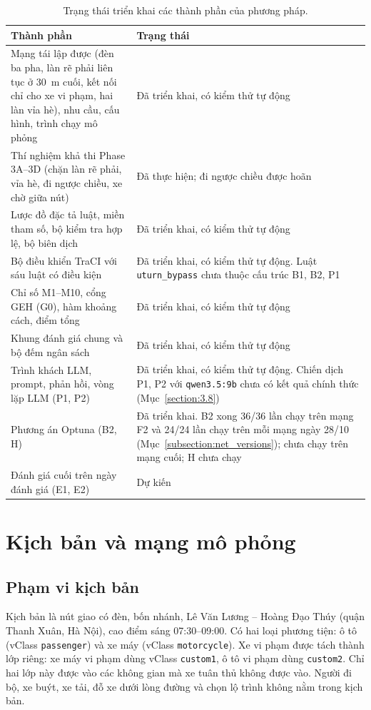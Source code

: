 \documentclass[../DoAn.tex]{subfiles}
\begin{document}
\begin{table}[ht]
\centering
\caption{Trạng thái triển khai các thành phần của phương pháp.}
\label{table:3.1}
\begin{tabular}{|p{6.5cm}|p{7.5cm}|}
\hline
\textbf{Thành phần} & \textbf{Trạng thái} \\ \hline
Mạng tái lập được (đèn ba pha, làn rẽ phải liên tục ở 30~m cuối, kết nối chỉ cho xe vi phạm, hai làn vỉa hè), nhu cầu, cấu hình, trình chạy mô phỏng & Đã triển khai, có kiểm thử tự động \\ \hline
Thí nghiệm khả thi Phase 3A--3D (chặn làn rẽ phải, vỉa hè, đi ngược chiều, xe chờ giữa nút) & Đã thực hiện; đi ngược chiều được hoãn \\ \hline
Lược đồ đặc tả luật, miền tham số, bộ kiểm tra hợp lệ, bộ biên dịch & Đã triển khai, có kiểm thử tự động \\ \hline
Bộ điều khiển TraCI với sáu luật có điều kiện & Đã triển khai, có kiểm thử tự động. Luật \texttt{uturn\_bypass} chưa thuộc cấu trúc B1, B2, P1 \\ \hline
Chỉ số M1--M10, cổng GEH (G0), hàm khoảng cách, điểm tổng & Đã triển khai, có kiểm thử tự động \\ \hline
Khung đánh giá chung và bộ đếm ngân sách & Đã triển khai, có kiểm thử tự động \\ \hline
Trình khách LLM, prompt, phản hồi, vòng lặp LLM (P1, P2) & Đã triển khai, có kiểm thử tự động. Chiến dịch P1, P2 với \texttt{qwen3.5:9b} chưa có kết quả chính thức (Mục~\ref{section:3.8}) \\ \hline
Phương án Optuna (B2, H) & Đã triển khai. B2 xong 36/36 lần chạy trên mạng F2 và 24/24 lần chạy trên mỗi mạng ngày 28/10 (Mục~\ref{subsection:net_versions}); chưa chạy trên mạng cuối; H chưa chạy \\ \hline
Đánh giá cuối trên ngày đánh giá (E1, E2) & Dự kiến \\ \hline
\end{tabular}
\end{table}

\section{Kịch bản và mạng mô phỏng}
\label{section:3.2}

\subsection{Phạm vi kịch bản}

Kịch bản là nút giao có đèn, bốn nhánh, Lê Văn Lương -- Hoàng Đạo Thúy (quận Thanh Xuân, Hà Nội), cao điểm sáng 07:30--09:00. Có hai loại phương tiện: ô tô (vClass \texttt{passenger}) và xe máy (vClass \texttt{motorcycle}). Xe vi phạm được tách thành lớp riêng: xe máy vi phạm dùng vClass \texttt{custom1}, ô tô vi phạm dùng \texttt{custom2}. Chỉ hai lớp này được vào các không gian mà xe tuân thủ không được vào. Người đi bộ, xe buýt, xe tải, đỗ xe dưới lòng đường và chọn lộ trình không nằm trong kịch bản.
\end{document}
